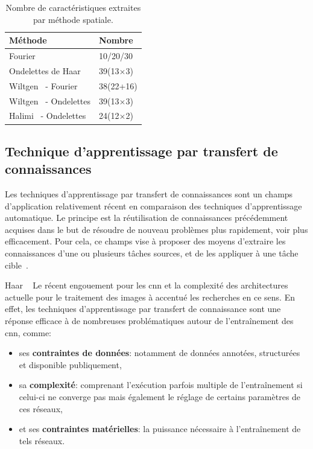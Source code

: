 \begin{table}[h]
    \centering
    \begin{tabular*}{0.6\linewidth}{l@{\extracolsep{\fill}}l}
        \toprule
        \textbf{Méthode}                        & \textbf{Nombre}   \\ \hline
        Fourier                                 & 10/20/30          \\ \hline
        Ondelettes de Haar                      & 39(13$\times$3)   \\ \hline
        Wiltgen~\cite{Wiltgen2008} - Fourier    & 38(22+16)         \\ \hline
        Wiltgen~\cite{Wiltgen2008} - Ondelettes & 39(13$\times$3)   \\ \hline
        Halimi~\cite{Halimi2017a} - Ondelettes  & 24(12$\times$2)   \\
        \bottomrule
    \end{tabular*}
    \caption{Nombre de caractéristiques extraites par méthode spatiale.}
    \label{tab:number_features_frequency}
\end{table}\par

\subsection{Technique d'apprentissage par transfert de connaissances}
Les techniques d'apprentissage par transfert de connaissances sont un champs d'application relativement récent en comparaison des techniques d'apprentissage automatique. Le principe est la réutilisation de connaissances précédemment acquises dans le but de résoudre de nouveau problèmes plus rapidement, voir plus efficacement. Pour cela, ce champs vise à  proposer des moyens d'extraire les connaissances d'une ou plusieurs tâches sources, et de les appliquer à une tâche cible~\cite{QiangYang2010}.\par
Haar ~\cite{Ghazali2007}
Le récent engouement pour les \gls{cnn} et la complexité des architectures actuelle pour le traitement des images à accentué les recherches en ce sens. En effet, les techniques d'apprentissage par transfert de connaissance sont une réponse efficace à de nombreuses problématiques autour de l'entraînement des \gls{cnn}, comme: 
\begin{itemize}
    \item ses \textbf{contraintes de données}: notamment de données annotées, structurées et disponible publiquement,
    \item sa \textbf{complexité}: comprenant l'exécution parfois multiple de l'entraînement si celui-ci ne converge pas mais également le réglage de certains paramètres de ces réseaux,
    \item et ses \textbf{contraintes matérielles}: la puissance nécessaire à l'entraînement de tels réseaux.
\end{itemize}\par

